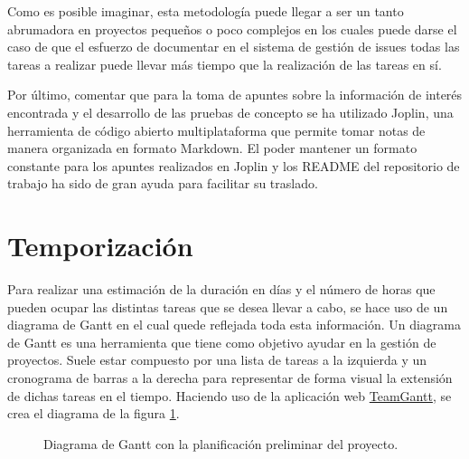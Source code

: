 Como es posible imaginar, esta metodología puede llegar a ser un tanto abrumadora en proyectos pequeños o poco 
complejos en los cuales puede darse el caso de que el esfuerzo de documentar en el sistema de gestión de issues 
todas las tareas a realizar puede llevar más tiempo que la realización de las tareas en sí.

Por último, comentar que para la toma de apuntes sobre la información de interés encontrada y el desarrollo de 
las pruebas de concepto se ha utilizado Joplin, una herramienta de código abierto multiplataforma que 
permite tomar notas de manera organizada en formato Markdown. El poder mantener un formato constante para los apuntes
realizados en Joplin y los README del repositorio de trabajo ha sido de gran ayuda para facilitar su traslado.

\section{Temporización}
Para realizar una estimación de la duración en días y el número de horas que pueden ocupar las distintas tareas que se desea 
llevar a cabo, se hace uso de un diagrama de Gantt en el cual quede reflejada toda esta información. Un diagrama de 
Gantt es una herramienta que tiene como objetivo ayudar en la gestión de proyectos. Suele estar compuesto por una lista 
de tareas a la izquierda y un cronograma de barras a la derecha para representar de forma visual la extensión de dichas 
tareas en el tiempo. Haciendo uso de la aplicación web \hyperlink{https://www.teamgantt.com/}{TeamGantt}, se crea el 
diagrama de la figura \ref{fig:gantt}.\bigskip
\begin{figure}[H]
    \caption{Diagrama de Gantt con la planificación preliminar del proyecto.}
    \label{fig:gantt}
\end{figure}

